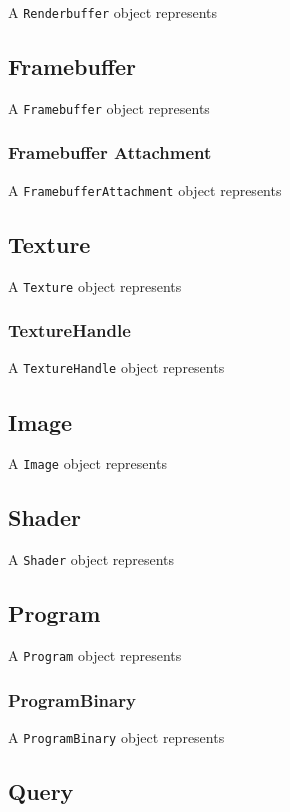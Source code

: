\documentclass{article}
\begin{document}
A \verb|Renderbuffer| object represents 

\subsection{Framebuffer}

A \verb|Framebuffer| object represents 

\subsubsection{Framebuffer Attachment}

A \verb|FramebufferAttachment| object represents 

\subsection{Texture}

A \verb|Texture| object represents 

\subsubsection{TextureHandle}

A \verb|TextureHandle| object represents 

\subsection{Image}

A \verb|Image| object represents 

\subsection{Shader}

A \verb|Shader| object represents 

\subsection{Program}

A \verb|Program| object represents 

\subsubsection{ProgramBinary}

A \verb|ProgramBinary| object represents 

\subsection{Query}
\end{document}
